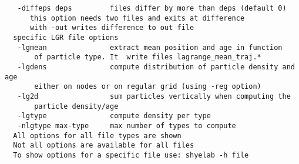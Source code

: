 \begin{verbatim}
   -diffeps deps         files differ by more than deps (default 0)
      this option needs two files and exits at difference
      with -out writes difference to out file
  specific LGR file options
   -lgmean               extract mean position and age in function
       of particle type. It  write files lagrange_mean_traj.*
   -lgdens               compute distribution of particle density and age
       either on nodes or on regular grid (using -reg option)
   -lg2d                 sum particles vertically when computing the
       particle density/age
   -lgtype               compute density per type
   -nlgtype max-type     max number of types to compute
  All options for all file types are shown
  Not all options are available for all files
  To show options for a specific file use: shyelab -h file
\end{verbatim}

